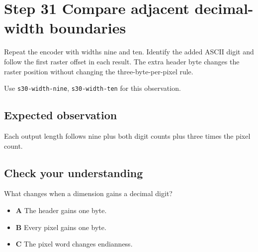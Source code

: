\section{Step 31 Compare adjacent decimal-width boundaries}\label{ppm-s31}

Repeat the encoder with widths nine and ten. Identify the added ASCII digit and follow the first raster offset in each result. The extra header byte changes the raster position without changing the three-byte-per-pixel rule.

Use \texttt{s30-width-nine}, \texttt{s30-width-ten} for this observation.

\subsection{Expected observation}
Each output length follows nine plus both digit counts plus three times the pixel count.

\subsection{Check your understanding}
What changes when a dimension gains a decimal digit?

\begin{itemize}
  \item \textbf{A} The header gains one byte.
  \item \textbf{B} Every pixel gains one byte.
  \item \textbf{C} The pixel word changes endianness.
\end{itemize}
